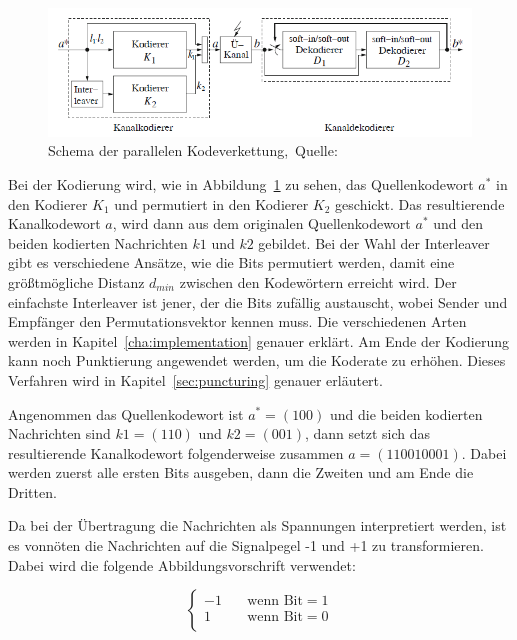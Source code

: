 \begin{figure}[th]
\centering
\includegraphics[width=\ScaleIfNeeded]{pictures/TurboModel}
\caption{Schema der parallelen Kodeverkettung,~Quelle:~\cite[251]{schoenfeld2012informations}}
\label{pic:turbomodel}
\end{figure}

Bei der Kodierung wird, wie in Abbildung~\ref{pic:turbomodel} zu sehen, das Quellenkodewort $a^*$ in den Kodierer $K_1$ und permutiert in den Kodierer $K_2$ geschickt. Das resultierende Kanalkodewort $a$, wird dann aus dem originalen Quellenkodewort $a^*$ und den beiden kodierten Nachrichten $k1$ und $k2$ gebildet. Bei der Wahl der Interleaver gibt es verschiedene Ansätze, wie die Bits permutiert werden, damit eine größtmögliche Distanz $d_{min}$ zwischen den Kodewörtern erreicht wird. Der einfachste Interleaver ist jener, der die Bits zufällig austauscht, wobei Sender und Empfänger den Permutationsvektor kennen muss. Die verschiedenen Arten werden in Kapitel~\ref{cha:implementation} genauer erklärt. Am Ende der Kodierung kann noch Punktierung angewendet werden, um die Koderate zu erhöhen. Dieses Verfahren wird in Kapitel~\ref{sec:puncturing} genauer erläutert.

\begin{e_exa}
Angenommen das Quellenkodewort ist $a^*=(100)$ und die beiden kodierten Nachrichten sind $k1=(110)$ und $k2=(001)$, dann setzt sich das resultierende Kanalkodewort folgenderweise zusammen $a=(110010001)$. Dabei werden zuerst alle ersten Bits ausgeben, dann die Zweiten und am Ende die Dritten.
\end{e_exa}

Da bei der Übertragung die Nachrichten als Spannungen interpretiert werden, ist es vonnöten die Nachrichten auf die Signalpegel -1 und +1 zu transformieren. Dabei wird die folgende Abbildungsvorschrift verwendet:

\begin{equation*}
	\begin{cases}
	-1 & \quad \text{wenn Bit}=1\\
	1 & \quad \text{wenn Bit}=0\\
	\end{cases}
\end{equation*}

